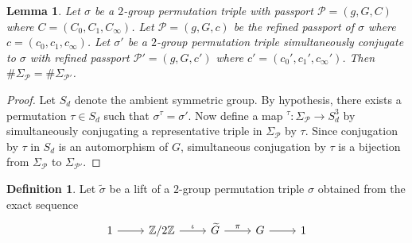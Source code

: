 \documentclass{dcthesis}
\newcommand{\ZZ}{\mathbb Z}
\newcommand{\mm}[1]{{\color{blue} \sf MM: [#1]}}
\newcommand{\wt}[1]{\widetilde{#1}}
\numberwithin{equation}{section}
\newtheorem{lemma}[equation]{Lemma}
\theoremstyle{definition}
\newtheorem{definition}[equation]{Definition}
\theoremstyle{remark}
\begin{document}
{{{    %
    \begin{lemma}
      \label{lem:coarsetorefined}
      Let $\sigma$ be a $2$-group
      permutation triple
      with passport
      $\mathcal{P}=(g,G,C)$
      where $C=(C_0,C_1,C_\infty)$.
      Let $\mathscr{P} = (g,G,c)$
      be the refined passport of $\sigma$
      where $c=(c_0,c_1,c_\infty)$.
      Let $\sigma'$ be a $2$-group
      permutation triple
      simultaneously conjugate to $\sigma$
      with refined passport $\mathscr{P}'=(g,G,c')$
      where $c' = (c_0',c_1',c_\infty')$.
      Then $\#\Sigma_\mathscr{P} = \#\Sigma_{\mathscr{P}'}$.
    \end{lemma}
    \begin{proof}
      Let $S_d$ denote the ambient symmetric group.
      By hypothesis,
      there exists a permutation
      $\tau\in S_d$
      such that
      $\sigma^\tau=\sigma'$.
      Now define a map
      ${}^\tau\colon\Sigma_\mathscr{P}
      \to S_d^3$
      by simultaneously conjugating
      a representative
      triple in $\Sigma_\mathscr{P}$
      by $\tau$.
      Since conjugation by $\tau$ in $S_d$
      is an automorphism of $G$,
      simultaneous conjugation by $\tau$
      is a bijection from
      $\Sigma_\mathscr{P}$
      to
      $\Sigma_{\mathscr{P}'}$.
    \end{proof}
    \begin{definition}
      \label{def:characteristiclift}
      Let $\wt{\sigma}$
      be a lift
      of a $2$-group
      permutation triple $\sigma$
      obtained from the exact sequence
      \begin{equation}
        \label{eqn:characteristiclift}
        \begin{tikzcd}
          1\arrow{r}&\ZZ/2\ZZ\arrow{r}{\iota}
                    &\wt{G}\arrow{r}{\pi}
                    &G\arrow{r}&1
        \end{tikzcd}
      \end{equation}

\end{definition}}}}
\end{document}
